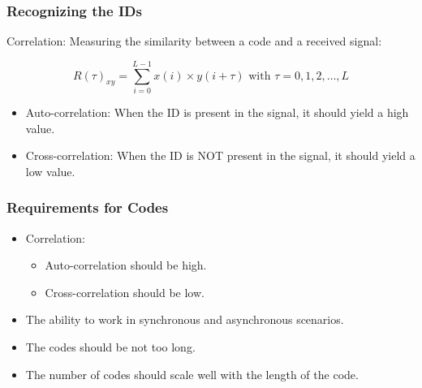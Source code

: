 \documentclass{beamer}
\begin{document}
	




	\begin{frame}\frametitle{Recognizing the IDs}
		
		Correlation: Measuring the similarity between a code and a received signal:

		\begin{equation*}
			R(\tau)_{xy} = \displaystyle\sum_{i = 0} ^ {L - 1} x(i) \times y(i + \tau) {\text{  with $\tau = 0, 1, 2, \dotsc, L$}}
		\end{equation*}

		\begin{itemize}

			\item Auto-correlation: When the ID is present in the signal, it should yield a high value.

			\item Cross-correlation: When the ID is NOT present in the signal, it should yield a low value.

		\end{itemize}
	\end{frame}



	\begin{frame}\frametitle{Requirements for Codes}
		
		\begin{itemize}

			\item Correlation:
			\begin{itemize}

				\item Auto-correlation should be high.

				\item Cross-correlation should be low.

			\end{itemize}

			\item The ability to work in synchronous and asynchronous scenarios.

			\item The codes should be not too long.

			\item The number of codes should scale well with the length of the code. 

		\end{itemize}
		
	\end{frame}
\end{document}
